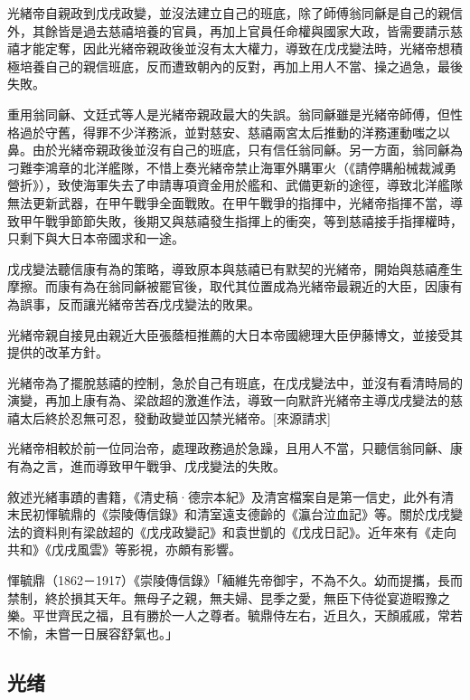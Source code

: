 光緒帝自親政到戊戌政變，並沒法建立自己的班底，除了師傅翁同龢是自己的親信外，其餘皆是過去慈禧培養的官員，再加上官員任命權與國家大政，皆需要請示慈禧才能定奪，因此光緒帝親政後並沒有太大權力，導致在戊戌變法時，光緒帝想積極培養自己的親信班底，反而遭致朝內的反對，再加上用人不當、操之過急，最後失敗。

重用翁同龢、文廷式等人是光緒帝親政最大的失誤。翁同龢雖是光緒帝師傅，但性格過於守舊，得罪不少洋務派，並對慈安、慈禧兩宮太后推動的洋務運動嗤之以鼻。由於光緒帝親政後並沒有自己的班底，只有信任翁同龢。另一方面，翁同龢為刁難李鴻章的北洋艦隊，不惜上奏光緒帝禁止海軍外購軍火（《請停購船械裁減勇營折》），致使海軍失去了申請專項資金用於艦和、武備更新的途徑，導致北洋艦隊無法更新武器，在甲午戰爭全面戰敗。在甲午戰爭的指揮中，光緒帝指揮不當，導致甲午戰爭節節失敗，後期又與慈禧發生指揮上的衝突，等到慈禧接手指揮權時，只剩下與大日本帝國求和一途。

戊戌變法聽信康有為的策略，導致原本與慈禧已有默契的光緒帝，開始與慈禧產生摩擦。而康有為在翁同龢被罷官後，取代其位置成為光緒帝最親近的大臣，因康有為誤事，反而讓光緒帝苦吞戊戌變法的敗果。

光緒帝親自接見由親近大臣張蔭桓推薦的大日本帝國總理大臣伊藤博文，並接受其提供的改革方針。

光緒帝為了擺脫慈禧的控制，急於自己有班底，在戊戌變法中，並沒有看清時局的演變，再加上康有為、梁啟超的激進作法，導致一向默許光緒帝主導戊戌變法的慈禧太后終於忍無可忍，發動政變並囚禁光緒帝。[來源請求]

光緒帝相較於前一位同治帝，處理政務過於急躁，且用人不當，只聽信翁同龢、康有為之言，進而導致甲午戰爭、戊戌變法的失敗。

敘述光緒事蹟的書籍，《清史稿·德宗本紀》及清宮檔案自是第一信史，此外有清末民初惲毓鼎的《崇陵傳信錄》和清室遠支德齡的《瀛台泣血記》等。關於戊戌變法的資料則有梁啟超的《戊戌政變記》和袁世凱的《戊戌日記》。近年來有《走向共和》《戊戌風雲》等影視，亦頗有影響。

惲毓鼎（1862－1917）《崇陵傳信錄》「緬維先帝御宇，不為不久。幼而提攜，長而禁制，終於損其天年。無母子之親，無夫婦、昆季之愛，無臣下侍從宴遊暇豫之樂。平世齊民之福，且有勝於一人之尊者。毓鼎侍左右，近且久，天顏戚戚，常若不愉，未嘗一日展容舒氣也。」

\subsection{光绪}

